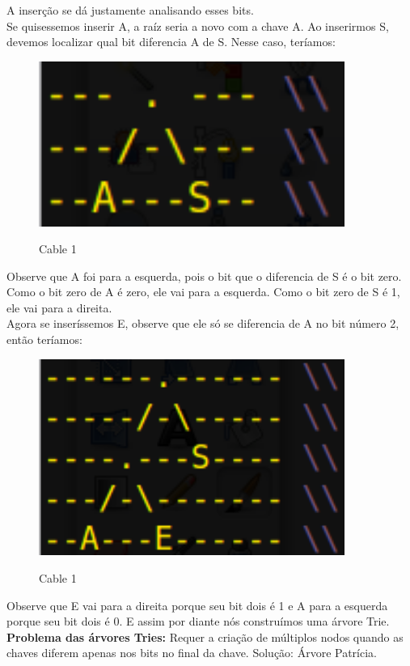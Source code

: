 \documentclass{article}
\begin{document}
A inserção se dá justamente analisando esses bits.\\
Se quisessemos inserir A, a raíz seria a novo com a chave A. Ao inserirmos S, devemos localizar qual
bit diferencia A de S. Nesse caso, teríamos:

\begin{figure}[h]
    \center
    \includegraphics[width=10cm]{imagens/trie1.png}
    \label{cable}
    \caption{Cable 1}
\end{figure}

Observe que A foi para a esquerda, pois o bit que o diferencia de S é o bit zero. Como o bit zero de
A é zero, ele vai para a esquerda. Como o bit zero de S é 1, ele vai para a direita.\\
Agora se inseríssemos E, observe que ele só se diferencia de A no bit número 2, então teríamos:

\begin{figure}[h]
    \center
    \includegraphics[width=10cm]{imagens/trie2.png}
    \label{cable}
    \caption{Cable 1}
\end{figure}

Observe que E vai para a direita porque seu bit dois é 1 e A para a esquerda porque seu bit dois é
0. E assim por diante nós construímos uma árvore Trie.\\
\textbf{Problema das árvores Tries:} Requer a criação de múltiplos nodos
quando as chaves diferem apenas nos bits no final da chave. Solução: Árvore Patrícia.
\end{document}
